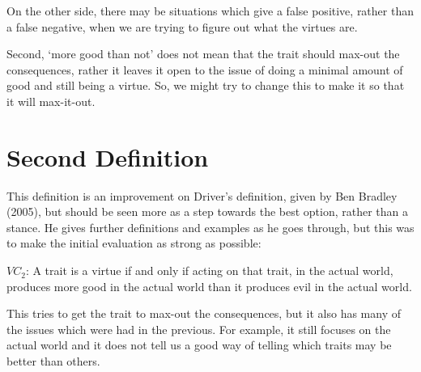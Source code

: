 
On the other side, there may be situations which give a false positive, rather than a false negative, when we are trying to figure out what the virtues are. 



Second, ‘more good than not’ does not mean that the trait should max-out the consequences, rather it leaves it open to the issue of doing a minimal amount of good and still being a virtue.  So, we might try to change this to make it so that it will max-it-out.

\section{Second Definition}

This definition is an improvement on Driver’s definition, given by Ben Bradley (2005), but should be seen more as a step towards the best option, rather than a stance. He gives further definitions and examples as he goes through, but this was to make the initial evaluation as strong as possible:
\begin{center}
$VC_2$: A trait is a virtue if and only if acting on that trait, in the actual world,  produces more good in the actual world than it produces evil in the actual world.
\end{center}
This tries to get the trait to max-out the consequences, but it also has many of the issues which were had in the previous. For example, it still focuses on the actual world and it does not tell us a good way of telling which traits may be better than others. 

